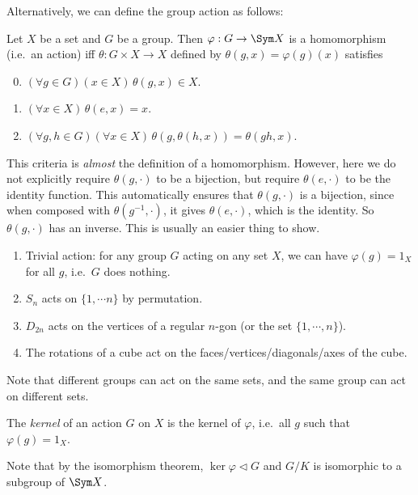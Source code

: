 \documentclass[a4paper]{article}
\begin{document}
Alternatively, we can define the group action as follows:
\begin{prop}
  Let $X$ be a set and $G$ be a group. Then $\varphi: G \to \Sym X$ is a homomorphism (i.e.\ an action) iff $\theta: G\times X \to X$ defined by $\theta(g, x) = \varphi(g)(x)$ satisfies
  \begin{enumerate}[label=\arabic{*}.]
      \setcounter{enumi}{-1}
    \item $(\forall g\in G)(x\in X)\,\theta(g, x)\in X$.
    \item $(\forall x\in X)\,\theta(e, x) = x$.
    \item $(\forall g, h\in G)(\forall x\in X)\,\theta(g, \theta (h, x)) = \theta(gh, x)$.
  \end{enumerate}
\end{prop}
This criteria is \emph{almost} the definition of a homomorphism. However, here we do not explicitly require $\theta(g, \cdot)$ to be a bijection, but require $\theta(e, \cdot)$ to be the identity function. This automatically ensures that $\theta(g, \cdot)$ is a bijection, since when composed with $\theta(g^{-1}, \cdot)$, it gives $\theta(e, \cdot)$, which is the identity. So $\theta(g, \cdot)$ has an inverse. This is usually an easier thing to show.

\begin{eg}\leavevmode
  \begin{enumerate}
    \item Trivial action: for any group $G$ acting on any set $X$, we can have $\varphi(g) = 1_X$ for all $g$, i.e.\ $G$ does nothing.
    \item $S_n$ acts on $\{1, \cdots n\}$ by permutation.
    \item $D_{2n}$ acts on the vertices of a regular $n$-gon (or the set $\{1, \cdots, n\}$).
    \item The rotations of a cube act on the faces/vertices/diagonals/axes of the cube.
  \end{enumerate}
\end{eg}
Note that different groups can act on the same sets, and the same group can act on different sets.

\begin{defi}
  The \emph{kernel} of an action $G$ on $X$ is the kernel of $\varphi$, i.e.\ all $g$ such that $\varphi(g) = 1_X$.
\end{defi}
Note that by the isomorphism theorem, $\ker \varphi\lhd G$ and $G/K$ is isomorphic to a subgroup of $\Sym X$.
\end{document}
